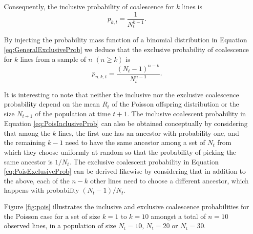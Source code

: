 \documentclass{article}
\begin{document}
Consequently, the inclusive probability of coalescence for $k$ lines is
\begin{equation}
	p_{k,t}=\frac{1}{N_t^{k-1}}.\label{eq:PoisInclusiveProb}
\end{equation}

By injecting the probability mass function of a binomial distribution in Equation 
\eqref{eq:GeneralExclusiveProb} we deduce that 
the exclusive probability of coalescence for $k$ lines from a sample of $n$ $(n \geq k)$ is
	\begin{equation}
		p_{n,k,t} = \frac{(N_t-1)^{n-k}}{N_t^{n-1}}.\label{eq:PoisExclusiveProb}
	\end{equation}
	
It is interesting to note that neither the inclusive nor the exclusive coalescence probability
depend on the mean $R_t$ of the Poisson offspring distribution or the size $N_{t+1}$
of the population at time $t+1$.
The inclusive coalescent probability in Equation \eqref{eq:PoisInclusiveProb}
can also be obtained conceptually by considering
that among the $k$ lines, the first one has an ancestor with probability one, 
and the remaining $k-1$ need to have the same ancestor among a set of $N_t$ from
which they choose uniformly at random so that the probability of picking the same ancestor
is $1/N_t$. The exclusive coalescent probability in Equation \eqref{eq:PoisExclusiveProb} 
can be derived likewise by considering
that in addition to the above, each of the $n-k$ other lines need to choose a different
ancestor, which happens with probability $(N_t-1)/N_t$.

Figure \ref{fig:pois} illustrates the inclusive and exclusive coalescence probabilities for
the Poisson case for a set of size $k=1$ to $k=10$ amongst a total of $n=10$ observed
lines, in a population of size $N_t=10$, $N_t=20$ or $N_t=30$. 
\end{document}
